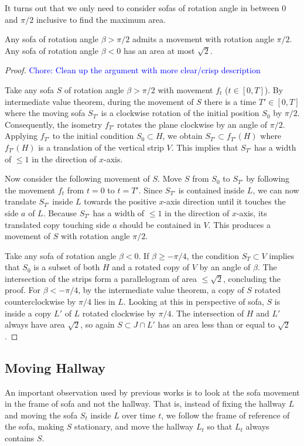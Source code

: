 It turns out that we only need to consider sofas of rotation angle in between 0 and $\pi / 2$ inclusive to find the maximum area.
\begin{lemma}
\label{lem:rot-angle}
Any sofa of rotation angle $\beta > \pi / 2$ admits a movement with rotation angle $\pi / 2$. 
Any sofa of rotation angle $\beta < 0$ has an area at most $\sqrt{2}$.
\end{lemma}
\begin{proof}
\textcolor{blue}{Chore: Clean up the argument with more clear/crisp description}

Take any sofa $S$ of rotation angle $\beta > \pi / 2$ with movement $f_t$ ($t \in [0, T]$). 
By intermediate value theorem, during the movement of $S$ there is a time $T' \in [0, T]$ where the moving sofa $S_{T'}$ is a clockwise rotation of the initial position $S_0$ by $\pi / 2$. 
Consequently, the isometry $f_{T'}$ rotates the plane clockwise by an angle of $\pi / 2$.
Applying $f_{T'}$ to the initial condition $S_0 \subset H$, we obtain $S_{T'} \subset f_{T'}(H)$ where $f_{T'}(H)$ is a translation of the vertical strip $V$.
This implies that $S_{T'}$ has a width of $\leq 1$ in the direction of $x$-axis.

Now consider the following movement of $S$.
Move $S$ from $S_0$ to $S_{T'}$ by following the movement $f_t$ from $t=0$ to $t=T'$.
Since  $S_{T'}$ is contained inside $L$, we can now translate $S_{T'}$ inside $L$ towards the positive $x$-axis direction until it touches the side $a$ of $L$.
Because $S_{T'}$ has a width of $\leq 1$ in the direction of $x$-axis, its translated copy touching side $a$ should be contained in $V$.
This produces a movement of $S$ with rotation angle $\pi / 2$.

Take any sofa of rotation angle $\beta < 0$. If $\beta \geq -\pi / 4$,
the condition $S_T \subset V$ implies that $S_0$ is a subset of both $H$ and a rotated copy of $V$ by an angle of $\beta$. 
The intersection of the strips form a parallelogram of area $\leq \sqrt{2}$, concluding the proof. 
For $\beta < -\pi / 4$, by the intermediate value theorem, a copy of $S$ rotated counterclockwise by $\pi / 4$ lies in $L$.
Looking at this in perspective of sofa, $S$ is inside a copy $L'$ of $L$ rotated clockwise by $\pi / 4$. 
The intersection of $H$ and $L'$ always have area $\sqrt{2}$, so again $S \subset J \cap L'$ has an area less than or equal to $\sqrt{2}$.
\end{proof}

\subsection{Moving Hallway}
An important observation used by previous works \cite{gerver1992moving, romik2018differential, kallus2018improved} is to look at the sofa movement in the frame of sofa and not the hallway.
That is, instead of fixing the hallway $L$ and moving the sofa $S_t$ inside $L$ over time $t$, 
we follow the frame of reference of the sofa, making $S$ stationary, and move the hallway $L_t$ so that $L_t$ always contains $S$.

